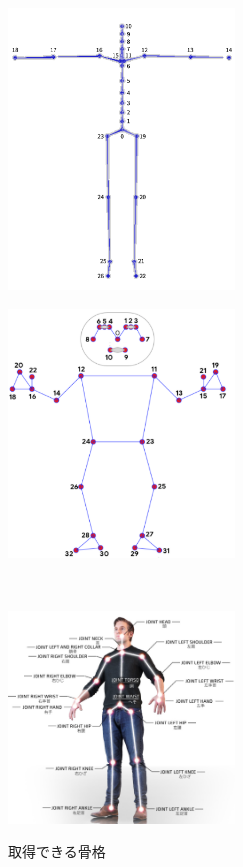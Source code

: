 \documentclass[a4j, fleqn, 12pt]{jsreport}
\begin{document}
\begin{figure}[t]
  \centering
  \begin{minipage}[]{0.45\hsize}
    \centering
    \includegraphics[width=6cm]{img/TechSpec_02.png}
    \label{mocopi}
  \end{minipage}
  \begin{minipage}[]{0.45\hsize}
    \centering
    \includegraphics[width=6cm]{img/media.png}
    \label{RGB}
  \end{minipage}\\
  \begin{minipage}[]{0.45\hsize}
    \centering
    \includegraphics[width=6cm]{img/nuitrack.png}
    \label{RGBD}
  \end{minipage}
  \caption{取得できる骨格}
  \label{sokutei}
\end{figure}
\end{document}
